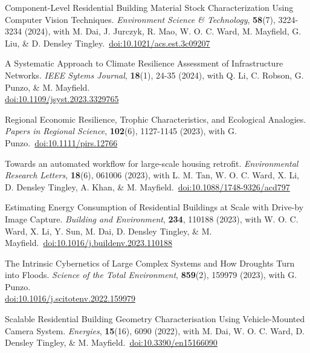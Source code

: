 \documentclass[10pt]{article}
\begin{document}
\begin{etaremune}[leftmargin=0ex, topsep=0ex]
	\item Component-Level Residential Building Material Stock Characterization Using Computer Vision Techniques. \emph{Environment Science \& Technology}, \textbf{58}(7), 3224-3234 (2024), with M. Dai, J. Jurczyk, R. Mao, W. O. C. Ward, M. Mayfield, G. Liu, \& D. Densley Tingley.~\href{https://doi.org/10.1021/acs.est.3c09207}{doi:10.1021/acs.est.3c09207}
		
	\item A Systematic Approach to Climate Resilience Assessment of Infrastructure Networks. \emph{IEEE Sytems Journal}, \textbf{18}(1), 24-35 (2024), with Q. Li, C. Robson, G. Punzo, \& M. Mayfield.~\\\href{hrrps://doi.org/10.1109/JSYST.2023.3329765}{doi:10.1109/jsyst.2023.3329765}
	
	\item Regional Economic Resilience, Trophic	Characteristics, and Ecological Analogies. \emph{Papers in Regional Science}, \textbf{102}(6), 1127-1145 (2023), with G. Punzo.~\href{https://doi.org/10.1111/pirs.12766}{doi:10.1111/pirs.12766}
	
	\item Towards an automated workflow for large-scale housing retrofit. \emph{Environmental Research Letters}, \textbf{18}(6), 061006 (2023), with L. M. Tan, W. O. C. Ward, X. Li, D. Densley Tingley, A. Khan, \& M. Mayfield.~\href{https://doi.org/10.1088/1748-9326/acd797}{doi:10.1088/1748-9326/acd797}

	\item Estimating Energy Consumption of Residential Buildings at Scale with Drive-by Image Capture. \emph{Building and Environment}, \textbf{234}, 110188 (2023), with W. O. C. Ward, X. Li, Y. Sun, M. Dai, D. Densley Tingley, \& M. Mayfield.~\href{https://doi.org/10.1016/j.buildenv.2023.110188}{doi:10.1016/j.buildenv.2023.110188}
	
	\item The Intrinsic Cybernetics of Large Complex Systems and How Droughts Turn into Floods. \emph{Science of the Total Environment}, \textbf{859}(2), 159979 (2023), with G. Punzo.~\\\href{https://doi.org/10.1016/j.scitotenv.2022.159979}{doi:10.1016/j.scitotenv.2022.159979}
	
	\item Scalable Residential Building Geometry Characterisation Using Vehicle-Mounted Camera System. \emph{Energies}, \textbf{15}(16), 6090 (2022), with M. Dai, W. O. C. Ward, D. Densley Tingley, \& M. Mayfield.~\href{https://doi.org/10.3390/en15166090}{doi:10.3390/en15166090}


\end{etaremune}
\end{document}

